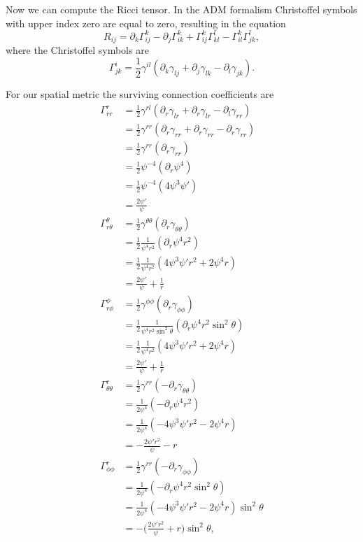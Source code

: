 \documentclass[12pt]{article}
\numberwithin{equation}{section}
\begin{document}
Now we can compute the Ricci tensor.  In the ADM formalism Christoffel symbols with upper index zero are equal to zero, resulting in the equation
\begin{equation}
R_{ij} = \partial_k \Gamma^k_{ij} - \partial_j \Gamma^k_{ik} + \Gamma^k_{ij} \Gamma^l_{kl} - \Gamma^k_{il} \Gamma^l_{jk},
\end{equation}
where the Christoffel symbols are
\begin{equation}
\Gamma^i_{jk} = \frac{1}{2} \gamma^{il} (\partial_k \gamma_{lj} + \partial_j \gamma_{lk} - \partial_l \gamma_{jk}).
\end{equation}

For our spatial metric the surviving connection coefficients are
\begin{equation}
\begin{aligned}
\Gamma^{r}_{rr} &= \frac{1}{2} \gamma^{rl} (\partial_r \gamma_{lr} + \partial_r \gamma_{lr} - \partial_l \gamma_{rr})\\
&= \frac{1}{2} \gamma^{rr} (\partial_r \gamma_{rr} + \partial_r \gamma_{rr} - \partial_r \gamma_{rr})\\
&= \frac{1}{2} \gamma^{rr} (\partial_r \gamma_{rr})\\
&= \frac{1}{2} \psi^{-4} (\partial_r \psi^4)\\
&= \frac{1}{2} \psi^{-4} (4 \psi^3 \psi')\\
&= \frac{2 \psi'}{\psi}\\
\Gamma^{\theta}_{r \theta} &= \frac{1}{2} \gamma^{\theta \theta} (\partial_r \gamma_{\theta \theta}) \\
&= \frac{1}{2} \frac{1}{\psi^4 r^2} (\partial_r \psi^4 r^2) \\
&= \frac{1}{2} \frac{1}{\psi^4 r^2} (4 \psi^3 \psi' r^2 + 2 \psi^4 r) \\
&= \frac{2 \psi'}{\psi}  + \frac{1}{r} \\
\Gamma^{\phi}_{r \phi} &= \frac{1}{2} \gamma^{\phi \phi} (\partial_r \gamma_{\phi \phi}) \\
&= \frac{1}{2} \frac{1}{\psi^4 r^2 \sin^2 \theta} (\partial_r \psi^4 r^2 \sin^2 \theta) \\
&= \frac{1}{2} \frac{1}{\psi^4 r^2} (4 \psi^3 \psi' r^2 + 2 \psi^4 r) \\
&= \frac{2 \psi'}{\psi} + \frac{1}{r} \\
\Gamma^r_{\theta \theta} &= \frac{1}{2} \gamma^{r r} (- \partial_r \gamma_{\theta \theta}) \\
&= \frac{1}{2 \psi^4} (- \partial_r \psi^4 r^2 ) \\
&= \frac{1}{2 \psi^4} (- 4 \psi^3 \psi' r^2 - 2 \psi^4 r ) \\
&= - \frac{2 \psi' r^2}{\psi} - r \\
\Gamma^r_{\phi \phi} &= \frac{1}{2} \gamma^{r r} ( - \partial_r \gamma_{\phi \phi}) \\
&= \frac{1}{2 \psi^4} ( - \partial_r \psi^4 r^2 \sin^2 \theta) \\
&= \frac{1}{2 \psi^4} ( - 4 \psi^3 \psi' r^2 - 2 \psi^4 r ) \sin^2 \theta \\
&= - \Big( \frac{2 \psi' r^2}{\psi} + r \Big) \sin^2 \theta, \\
\end{aligned}
\end{equation}
\end{document}
